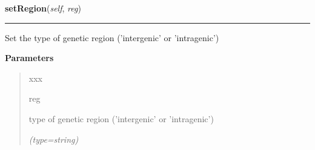     \label{script-phyloFixedVar:var:setRegion}

    \vspace{0.5ex}

\hspace{.8\funcindent}\begin{boxedminipage}{\funcwidth}

    \raggedright \textbf{setRegion}(\textit{self}, \textit{reg})

    \vspace{-1.5ex}

    \rule{\textwidth}{0.5\fboxrule}
\setlength{\parskip}{2ex}
    Set the type of genetic region ('intergenic' or 'intragenic')

\setlength{\parskip}{1ex}
      \textbf{Parameters}
      \vspace{-1ex}

      \begin{quote}
        \begin{Ventry}{xxx}

          \item[reg]

          type of genetic region ('intergenic' or 'intragenic')

            {\it (type=string)}

        \end{Ventry}

      \end{quote}

    \end{boxedminipage}

    \label{script-phyloFixedVar:var:setImpact}

    \vspace{0.5ex}

